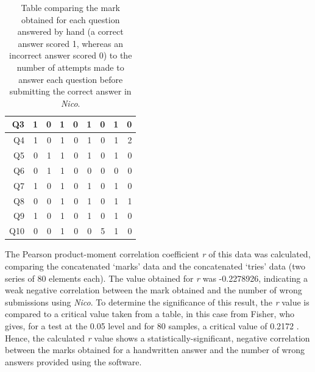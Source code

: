 \documentclass[12pt,twoside,notitlepage,xetex]{report}
\begin{document}
{\begin{center}
\begin{table}[H]
\begin{center}
\begin{tabular}{|r||r|r||r|r||r|r||r|r|}
Q3 & 1 & 0 & 1 & 0 & 1 & 0 & 1 & 0\\ \hline
Q4 & 1 & 0 & 1 & 0 & 1 & 0 & 1 & 2\\ \hline
Q5 & 0 & 1 & 1 & 0 & 1 & 0 & 1 & 0\\ \hline
Q6 & 0 & 1 & 1 & 0 & 0 & 0 & 0 & 0\\ \hline
Q7 & 1 & 0 & 1 & 0 & 1 & 0 & 1 & 0\\ \hline
Q8 & 0 & 0 & 1 & 0 & 1 & 0 & 1 & 1\\ \hline
Q9 & 1 & 0 & 1 & 0 & 1 & 0 & 1 & 0\\ \hline
Q10 & 0 & 0 & 1 & 0 & 0 & 5 & 1 & 0\\
\hline
\end{tabular}
\end{center}
\caption{Table comparing the mark obtained for each question answered by hand (a correct answer scored 1, whereas an incorrect answer scored 0) to the number of attempts made to answer each question before submitting the correct answer in \emph{Nico}.}
\label{tab:MarksTries}
\end{table}
\end{center}

The Pearson product-moment correlation coefficient \emph{r} of this data was calculated, comparing the concatenated `marks' data and the concatenated `tries' data (two series of 80 elements each).  The value obtained for \emph{r} was -0.2278926, indicating a weak negative correlation between the mark obtained and the number of wrong submissions using \emph{Nico}.  To determine the significance of this result, the \emph{r} value is compared to a critical value taken from a table, in this case from Fisher, who gives, for a test at the 0.05 level and for 80 samples, a critical value of 0.2172 \cite{Fisher1990}.  Hence, the calculated \emph{r} value shows a statistically-significant, negative correlation between the marks obtained for a handwritten answer and the number of wrong answers provided using the software.

}
\end{document}
